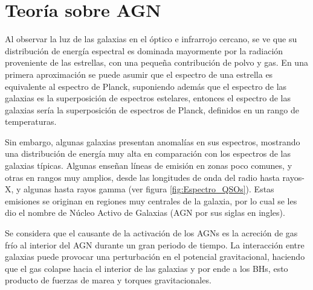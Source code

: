 \begin{savequote}[50mm]
\end{savequote}




\chapter{Teoría sobre AGN}
\label{cha:Theoretical Framework}


Al observar la luz de las galaxias en el óptico e infrarrojo cercano, se ve que su distribución de energía espectral es dominada mayormente por la radiación proveniente de las estrellas, con una pequeña contribución de polvo y gas. En una primera aproximación se puede asumir que el espectro de una estrella es equivalente al espectro de Planck, suponiendo además que el espectro de las galaxias es la superposición de espectros estelares, entonces el espectro de las galaxias sería la superposición de espectros de Planck, definidos en un rango de temperaturas. 


Sin embargo, algunas galaxias presentan anomalías en sus espectros,  mostrando una distribución de energía muy alta en comparación con los espectros  de las galaxias típicas. Algunas enseñan líneas de emisión en zonas poco comunes, y otras en rangos muy amplios, desde las longitudes de onda del radio hasta rayos-X, y algunas hasta rayos gamma (ver figura \ref{fig:Espectro_QSOs}). Estas emisiones se originan en regiones muy centrales de la galaxia, por lo cual se les dio el nombre de Núcleo Activo de Galaxias (AGN por sus siglas en ingles).

Se considera que el causante de la activación de los AGNs es la acreción de gas frío al interior del AGN durante un gran periodo de tiempo. La interacción entre galaxias puede provocar una perturbación en el potencial gravitacional, haciendo que el gas colapse hacia el interior de las galaxias y por ende a los BHs, esto producto de fuerzas de marea y torques gravitacionales.

